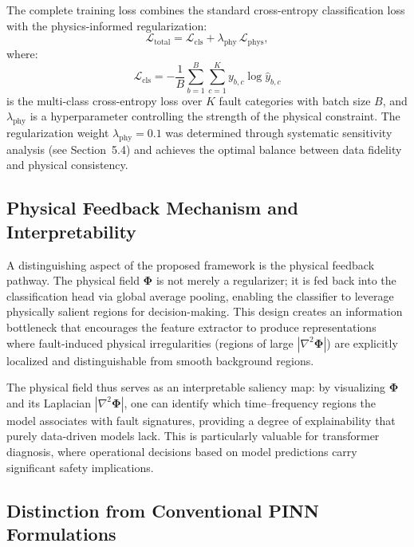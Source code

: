 \documentclass[twocolumn,iicol,pdflatex,sn-mathphys-num]{sn-jnl}%
\begin{document}
The complete training loss combines the standard cross-entropy classification loss with the physics-informed regularization:
\begin{equation}
	\mathcal{L}_{\text{total}} = \mathcal{L}_{\text{cls}} + \lambda_{\text{phy}} \, \mathcal{L}_{\text{phys}},
	\label{eq:total_loss}
\end{equation}
where:
\begin{equation}
	\mathcal{L}_{\text{cls}} = -\frac{1}{B} \sum_{b=1}^{B} \sum_{c=1}^{K} y_{b,c} \log \hat{y}_{b,c}
	\label{eq:cls_loss}
\end{equation}
is the multi-class cross-entropy loss over $K$ fault categories with batch size $B$, and $\lambda_{\text{phy}}$ is a hyperparameter controlling the strength of the physical constraint. The regularization weight $\lambda_{\text{phy}} = 0.1$ was determined through systematic sensitivity analysis (see Section~5.4) and achieves the optimal balance between data fidelity and physical consistency.

\subsection{Physical Feedback Mechanism and Interpretability}

A distinguishing aspect of the proposed framework is the physical feedback pathway. The physical field $\bm{\Phi}$ is not merely a regularizer; it is fed back into the classification head via global average pooling, enabling the classifier to leverage physically salient regions for decision-making. This design creates an information bottleneck that encourages the feature extractor to produce representations where fault-induced physical irregularities (regions of large $|\nabla^2 \bm{\Phi}|$) are explicitly localized and distinguishable from smooth background regions.

The physical field thus serves as an interpretable saliency map: by visualizing $\bm{\Phi}$ and its Laplacian $|\nabla^2 \bm{\Phi}|$, one can identify which time--frequency regions the model associates with fault signatures, providing a degree of explainability that purely data-driven models lack. This is particularly valuable for transformer diagnosis, where operational decisions based on model predictions carry significant safety implications.

\subsection{Distinction from Conventional PINN Formulations}
\end{document}
